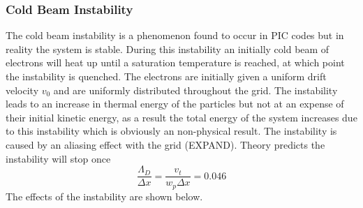 \documentclass[12pt]{article}
\def\be{\begin{equation}}
\def\ee{\end{equation}}
\begin{document}
\subsubsection{Cold Beam Instability} 
The cold beam instability is a phenomenon found to occur in PIC codes but in reality the system is stable. During this instability an initially cold beam of electrons will heat up until a saturation temperature is reached, at which point the instability is quenched.  The electrons are initially given a uniform drift velocity $v_0$ and are uniformly distributed throughout the grid. The instability leads to an increase in thermal energy of the particles but not at an expense of their initial kinetic energy, as a result the total energy of the system increases due to this instability which is obviously an non-physical result. The instability is caused by an aliasing effect with the grid (EXPAND). Theory predicts the instability will stop once 
\be 
\frac{\Lambda_D }{\Delta x} = \frac{v_t}{w_p \Delta x} = 0.046
\label{eq:cold_beam}
\ee 
The effects of the instability are shown below. 
\end{document}
